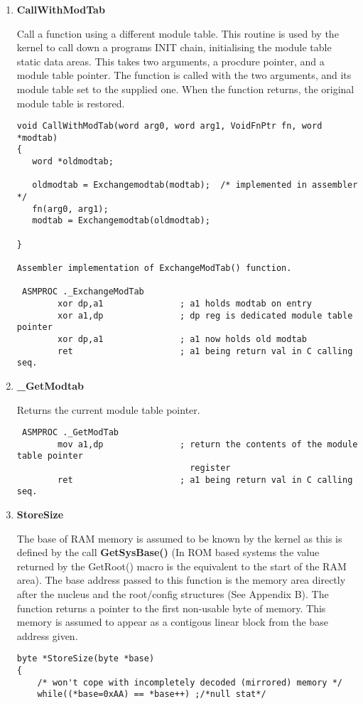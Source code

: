 \begin{enumerate}

\item {\bf CallWithModTab}

Call a function using a different module table. This routine is used by
the kernel to call down a programs INIT chain, initialising the
module table static data areas.
This takes two arguments, a procdure pointer, and a module table pointer.
The function is called with the two arguments, and its module table set
to the supplied one.
When the function returns, the original module table is restored.

\scriptsize
\begin{verbatim}
void CallWithModTab(word arg0, word arg1, VoidFnPtr fn, word *modtab)
{
   word *oldmodtab;

   oldmodtab = Exchangemodtab(modtab);  /* implemented in assembler */
   fn(arg0, arg1);
   modtab = Exchangemodtab(oldmodtab);

}

Assembler implementation of ExchangeModTab() function.

 ASMPROC ._ExchangeModTab
        xor dp,a1               ; a1 holds modtab on entry
        xor a1,dp               ; dp reg is dedicated module table pointer
        xor dp,a1               ; a1 now holds old modtab
        ret                     ; a1 being return val in C calling seq.
\end{verbatim}
\normalsize

\item {\bf \_GetModtab}

Returns the current module table pointer.
\scriptsize
\begin{verbatim}
 ASMPROC ._GetModTab
        mov a1,dp               ; return the contents of the module table pointer 
                                  register
        ret                     ; a1 being return val in C calling seq.
\end{verbatim}
\normalsize

\item {\bf StoreSize}
\begin{sloppypar}
The base of RAM memory is assumed to be known by the kernel as this is defined
by the call {\bf GetSysBase()} (In ROM based systems the value returned by the
GetRoot() macro is the equivalent to the start of the RAM area).
The base address passed to this function is the memory area directly after the
nucleus and the root/config structures (See Appendix B).
The function returns a pointer to the first non-usable byte of memory.
This memory is assumed to appear as a contigous linear block from the
base address given.
\end{sloppypar}
\scriptsize
\begin{verbatim}
byte *StoreSize(byte *base)
{
    /* won't cope with incompletely decoded (mirrored) memory */
    while((*base=0xAA) == *base++) ;/*null stat*/


\end{verbatim}
\end{enumerate}
